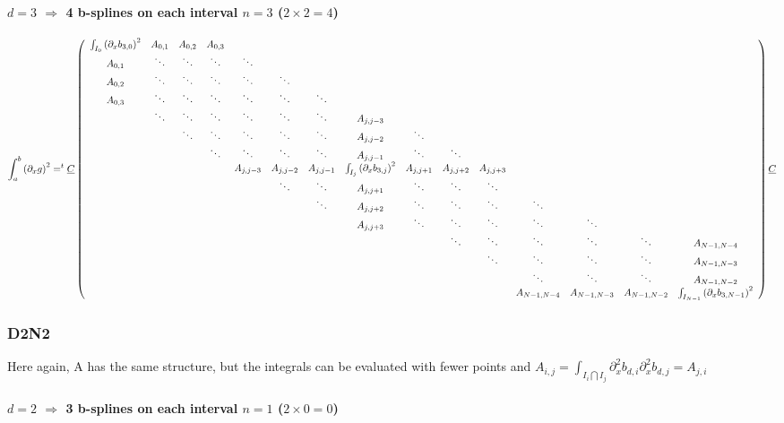 \documentclass[paper=a4, fontsize=11pt]{scrartcl}
\numberwithin{equation}{section}		%
\numberwithin{figure}{section}			%
\numberwithin{table}{section}				%
\begin{document}
\begin{landscape}
\paragraph{\textbf{$d=3$ $\Rightarrow$ 4 b-splines on each interval $n=3$ ($2\times2=4$)}}
$$
\int_{a}^{b} \left(\partial_xg\right)^2 = ^t\underline{C} \left(\begin{array}{ccccccccccccccc}
\int_{I_0}\left(\partial_xb_{3,0}\right)^2&A_{0,1}&A_{0,2}&A_{0,3}&&&&&&&&&&&\\ A_{0,1}&\ddots&\ddots&\ddots&\ddots&&&&&&&&&&\\ A_{0,2}&\ddots&\ddots&\ddots&\ddots&\ddots&&&&&&&&&\\ A_{0,3}&\ddots&\ddots&\ddots&\ddots&\ddots&\ddots&&&&&&&&\\
&\ddots&\ddots&\ddots&\ddots&\ddots&\ddots&A_{j,j-3}&&&&&&&\\ &&\ddots&\ddots&\ddots&\ddots&\ddots&A_{j,j-2}&\ddots&&&&&&\\ &&&\ddots&\ddots&\ddots&\ddots&A_{j,j-1}&\ddots&\ddots&&&&&\\
&&&&A_{j,j-3}&A_{j,j-2}&A_{j,j-1}&\int_{I_j}\left(\partial_xb_{3,j}\right)^2&A_{j,j+1}&A_{j,j+2}&A_{j,j+3}&&&&\\
&&&&&\ddots&\ddots&A_{j,j+1}&\ddots&\ddots&\ddots&&&&\\ &&&&&&\ddots&A_{j,j+2}&\ddots&\ddots&\ddots&\ddots&&&\\ &&&&&&&A_{j,j+3}&\ddots&\ddots&\ddots&\ddots&\ddots&&\\
&&&&&&&&&\ddots&\ddots&\ddots&\ddots&\ddots&A_{N-1,N-4}\\ &&&&&&&&&&\ddots&\ddots&\ddots&\ddots&A_{N-1,N-3}\\
&&&&&&&&&&&\ddots&\ddots&\ddots&A_{N-1,N-2}\\ &&&&&&&&&&&A_{N-1,N-4}&A_{N-1,N-3}&A_{N-1,N-2}&\int_{I_{N-1}}\left(\partial_xb_{3,N-1}\right)^2
\end{array}\right) \underline{C}\\
$$

\subsubsection{D2N2}
Here again, A has the same structure, but the integrals can be evaluated with fewer points and $A_{i,j} = \int_{I_i\bigcap I_j}\partial^2_xb_{d,i}\partial^2_xb_{d,j} = A_{j,i}$
\paragraph{\textbf{$d=2$ $\Rightarrow$ 3 b-splines on each interval $n=1$ ($2\times0=0$)}}

\end{landscape}
\end{document}
